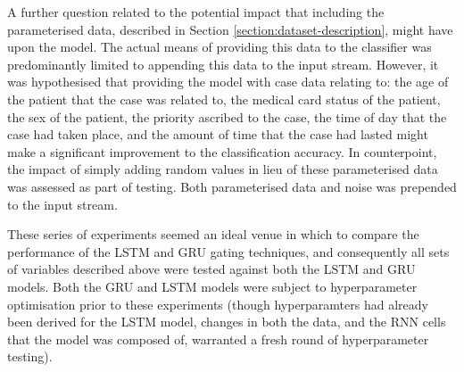 A further question related to the potential impact that including the parameterised data, described in Section \ref{section:dataset-description}, might have upon the model. The actual means of providing this data to the classifier was predominantly limited to appending this data to the input stream. However, it was hypothesised that providing the model with case data relating to: the age of the patient that the case was related to, the medical card status of the patient, the sex of the patient, the priority ascribed to the case, the time of day that the case had taken place, and the amount of time that the case had lasted might make a significant improvement to the classification accuracy. In counterpoint, the impact of simply adding random values in lieu of these parameterised data was assessed as part of testing. Both parameterised data and noise was prepended to the input stream. 



These series of experiments seemed an ideal venue in which to compare the performance of the LSTM and GRU gating techniques, and consequently all sets of variables described above were tested against both the LSTM and GRU models. Both the GRU and LSTM models were subject to hyperparameter optimisation prior to these experiments (though hyperparamters had already been derived for the LSTM model, changes in both the data, and the RNN cells that the model was composed of, warranted a fresh round of hyperparameter testing).       










